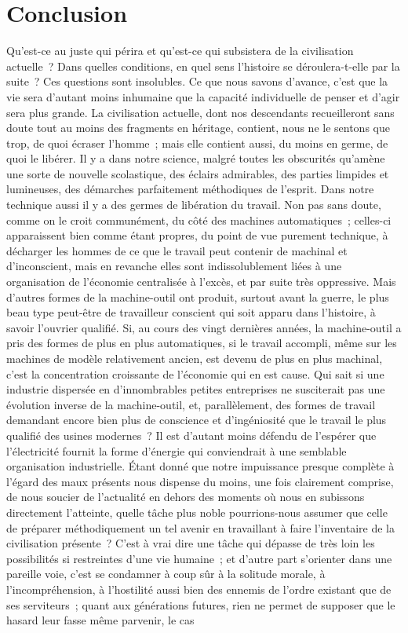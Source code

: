 \documentclass[french,twoside]{book} %
\begin{document}
\section[Conclusion]{Conclusion}\renewcommand{\leftmark}{Conclusion}

\noindent \par
Qu'est-ce au juste qui périra et qu'est-ce qui subsistera de la civilisation actuelle ? Dans quelles conditions, en quel sens l'histoire se déroulera-t-elle par la suite ? Ces questions sont insolubles. Ce que nous savons d'avance, c'est que la vie sera d'autant moins inhumaine que la capacité individuelle de penser et d'agir sera plus grande. La civilisation actuelle, dont nos descendants recueilleront sans doute tout au moins des fragments en héritage, contient, nous ne le sentons que trop, de quoi écraser l'homme ; mais elle contient aussi, du moins en germe, de quoi le libérer. Il y a dans notre science, malgré toutes les obscurités qu'amène une sorte de nouvelle scolastique, des éclairs admirables, des parties limpides et lumineuses, des démarches parfaitement méthodiques de l'esprit. Dans notre technique aussi il y a des germes de libération du travail. Non pas sans doute, comme on le croit communément, du côté des machines automatiques ; celles-ci apparaissent bien comme étant propres, du point de vue purement technique, à décharger les hommes de ce que le travail peut contenir de machinal et d'inconscient, mais en revanche elles sont indissolublement liées à une organisation de l'économie centralisée à l'excès, et par suite très oppressive. Mais d'autres formes de la machine-outil ont produit, surtout avant la guerre, le plus beau type peut-être de travailleur conscient qui soit apparu dans l'histoire, à savoir l'ouvrier qualifié. Si, au cours des vingt dernières années, la machine-outil a pris des formes de plus en plus automatiques, si le travail accompli, même sur les machines de modèle relativement ancien, est devenu de plus en plus machinal, c'est la concentration croissante de l'économie qui en est cause. Qui sait si une industrie dispersée en d'innombrables petites entreprises ne susciterait pas une évolution inverse de la machine-outil, et, parallèlement, des formes de travail demandant encore bien plus de conscience et d'ingéniosité que le travail le plus qualifié des usines modernes ? Il est d'autant moins défendu de l'espérer que l'électricité fournit la forme d'énergie qui conviendrait à une semblable organisation industrielle. Étant donné que notre impuissance presque complète à l'égard des maux présents nous dispense du moins, une fois clairement comprise, de nous soucier de l'actualité en dehors des moments où nous en subissons directement l'atteinte, quelle tâche plus noble pourrions-nous assumer que celle de préparer méthodiquement un tel avenir en travaillant à faire l'inventaire de la civilisation présente ? C'est à vrai dire une tâche qui dépasse de très loin les possibilités si restreintes d'une vie humaine ; et d'autre part s'orienter dans une pareille voie, c'est se condamner à coup sûr à la solitude morale, à l'incompréhension, à l'hostilité aussi bien des ennemis de l'ordre existant que de ses serviteurs ; quant aux générations futures, rien ne permet de supposer que le hasard leur fasse même parvenir, le cas 
\end{document}
